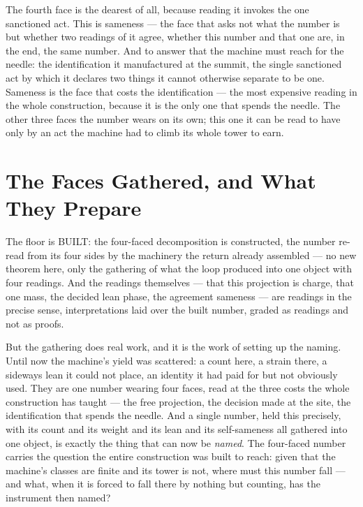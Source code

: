 The fourth face is the dearest of all, because reading it invokes the one sanctioned act. This is sameness ---
the face that asks not what the number is but whether two readings of it agree, whether this number and that one
are, in the end, the same number. And to answer that the machine must reach for the needle: the identification it
manufactured at the summit, the single sanctioned act by which it declares two things it cannot otherwise
separate to be one. Sameness is the face that costs the identification --- the most expensive reading in the whole
construction, because it is the only one that spends the needle. The other three faces the number wears on its own;
this one it can be read to have only by an act the machine had to climb its whole tower to earn.

\section{The Faces Gathered, and What They Prepare}

The floor is BUILT: the four-faced decomposition is constructed, the number re-read from its four sides by the
machinery the return already assembled --- no new theorem here, only the gathering of what the loop produced into
one object with four readings. And the readings themselves --- that this projection is charge, that one mass, the
decided lean phase, the agreement sameness --- are readings in the precise sense, interpretations laid over
the built number, graded as readings and not as proofs.

But the gathering does real work, and it is the work of setting up the naming. Until now the machine's yield was
scattered: a count here, a strain there, a sideways lean it could not place, an identity it had paid for but not
obviously used. They are one number wearing four faces, read at the three costs the whole construction has taught
--- the free projection, the decision made at the site, the identification that spends the needle. And
a single number, held this precisely, with its count and its weight and its lean and its self-sameness all
gathered into one object, is exactly the thing that can now be \emph{named}. The four-faced number carries the
question the entire construction was built to reach: given that the machine's classes are finite and its tower is
not, where must this number fall --- and what, when it is forced to fall there by nothing but counting, has the
instrument then named?
